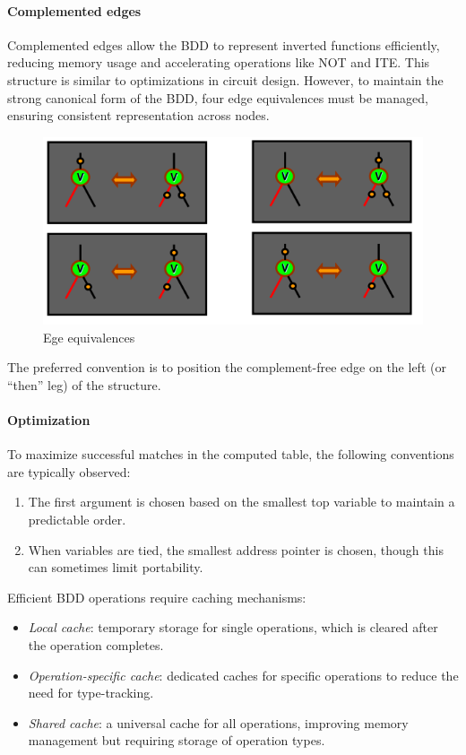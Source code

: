 \paragraph*{Complemented edges}
Complemented edges allow the BDD to represent inverted functions efficiently, reducing memory usage and accelerating operations like NOT and ITE. 
This structure is similar to optimizations in circuit design. 
However, to maintain the strong canonical form of the BDD, four edge equivalences must be managed, ensuring consistent representation across nodes. 
\begin{figure}[H]
    \centering
    \includegraphics[width=0.75\linewidth]{images/ed1.png}
    \caption{Ege equivalences}
\end{figure}
The preferred convention is to position the complement-free edge on the left (or “then” leg) of the structure.

\paragraph*{Optimization}
To maximize successful matches in the computed table, the following conventions are typically observed:
\begin{enumerate}
    \item The first argument is chosen based on the smallest top variable to maintain a predictable order.
    \item When variables are tied, the smallest address pointer is chosen, though this can sometimes limit portability.
\end{enumerate}
Efficient BDD operations require caching mechanisms:
\begin{itemize}
    \item \textit{Local cache}: temporary storage for single operations, which is cleared after the operation completes.
    \item \textit{Operation-specific cache}: dedicated caches for specific operations to reduce the need for type-tracking.
    \item \textit{Shared cache}: a universal cache for all operations, improving memory management but requiring storage of operation types.
\end{itemize}

